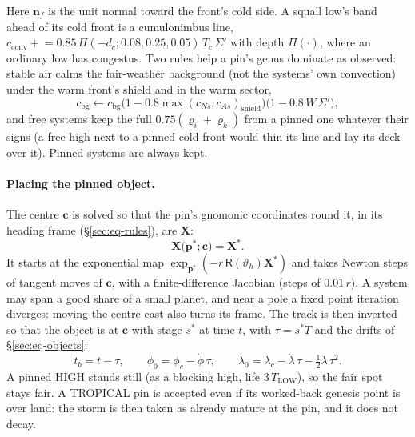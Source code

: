 \documentclass[11pt,a4paper]{article}
\begin{document}
Here $\mathbf{n}_f$ is the unit normal toward the front's cold side. A squall low's band ahead
of its cold front is a cumulonimbus line, $c_{\mathrm{conv}}\mathrel{+}=0.85\,\Pi(-d_c;0.08,0.25,0.05)\,T_c\,\Sigma'$
with depth $\Pi(\cdot)$, where an ordinary low has congestus. Two rules help a pin's genus
dominate as observed: stable air calms the fair-weather background (not the systems' own
convection) under the warm front's shield and in the warm sector,
\begin{equation}
  c_{\mathrm{bg}}\leftarrow c_{\mathrm{bg}}\big(1-0.8\max(c_{Ns},c_{As})_{\mathrm{shield}}\big)\big(1-0.8\,W\,\Sigma'\big),
\end{equation}
and free systems keep the full $0.75(\varrho_i+\varrho_k)$ from a pinned one whatever their
signs (a free high next to a pinned cold front would thin its line and lay its deck over it).
Pinned systems are always kept.

\paragraph{Placing the pinned object.} The centre $\mathbf{c}$ is solved so that the pin's
gnomonic coordinates round it, in its heading frame (\S\ref{sec:eq-rules}), are $\mathbf{X}$:
\begin{equation}
  \mathbf{X}\big(\mathbf{p}^*;\mathbf{c}\big)=\mathbf{X}^*.
\end{equation}
It starts at the exponential map $\exp_{\mathbf{p}^*}(-r\,\mathsf{R}(\vartheta_h)\mathbf{X}^*)$
and takes Newton steps of tangent moves of $\mathbf{c}$, with a finite-difference Jacobian
(steps of $0.01\,r$). A system may span a good share of a small planet, and near a pole a fixed
point iteration diverges: moving the centre east also turns its frame. The track is then
inverted so that the object is at $\mathbf{c}$ with stage $s^*$ at time $t$, with
$\tau=s^*T$ and the drifts of \S\ref{sec:eq-objects}:
\begin{equation}
  t_b=t-\tau,\qquad
  \phi_0=\phi_c-\dot\phi\,\tau,\qquad
  \lambda_0=\lambda_c-\dot\lambda\,\tau-\tfrac12\ddot\lambda\,\tau^2.
\end{equation}
A pinned HIGH stands still (as a blocking high, life $3\,\bar T_{\mathrm{LOW}}$), so the fair spot
stays fair. A TROPICAL pin is accepted even if its worked-back genesis point is over land:
the storm is then taken as already mature at the pin, and it does not decay.
\end{document}
